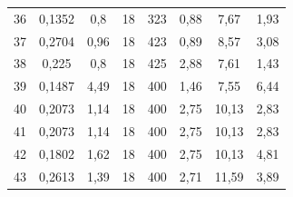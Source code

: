 \documentclass[12pt,a4paper]{article}
\begin{document}
\begin{table}[]
{\begin{tabular}{|c|c|c|c|c|c|c|c|}
    36                       & 0,1352                 & 0,8                        & 18                                         & 323                       & 0,88                                            & 7,67                                     & 1,93                                  \\
    37                       & 0,2704                 & 0,96                       & 18                                         & 423                       & 0,89                                            & 8,57                                     & 3,08                                  \\
    38                       & 0,225                  & 0,8                        & 18                                         & 425                       & 2,88                                            & 7,61                                     & 1,43                                  \\
    39                       & 0,1487                 & 4,49                       & 18                                         & 400                       & 1,46                                            & 7,55                                     & 6,44                                  \\
    40                       & 0,2073                 & 1,14                       & 18                                         & 400                       & 2,75                                            & 10,13                                    & 2,83                                  \\
    41                       & 0,2073                 & 1,14                       & 18                                         & 400                       & 2,75                                            & 10,13                                    & 2,83                                  \\
    42                       & 0,1802                 & 1,62                       & 18                                         & 400                       & 2,75                                            & 10,13                                    & 4,81                                  \\
    43                       & 0,2613                 & 1,39                       & 18                                         & 400                       & 2,71                                            & 11,59                                    & 3,89                                  \\

\end{tabular}}
\end{table}
\end{document}
